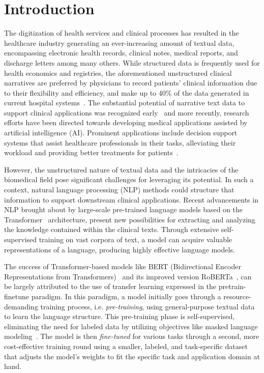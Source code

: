 \chapter{Introduction} \label{chap:introduction}

The digitization of health services and clinical processes has resulted in the
healthcare industry generating an ever-increasing amount of textual data,
encompassing electronic health records, clinical notes, medical reports, and
discharge letters among many others. While structured data is frequently used
for health economics and registries, the aforementioned unstructured clinical
narratives are preferred by physicians to record patients' clinical information
due to their flexibility and efficiency, and make up to 40\% of the data
generated in current hospital systems~\cite{wang2018clinical,
dalianis2009stockholm}. The substantial potential of narrative text data to
support clinical applications was recognized early~\cite{sager1994natural,
borst1991textinfo,friedman1995architectural} and more recently, research efforts
have been directed towards developing medical applications assisted by
artificial intelligence (AI). Prominent applications include decision support
systems that assist healthcare professionals in their tasks, alleviating their
workload and providing better treatments for patients~\cite{zhou2022natural}.

However, the unstructured nature of textual data and the intricacies of the
biomedical field pose significant challenges for leveraging its potential. In
such a context, natural language processing (NLP) methods could structure that
information to support downstream clinical applications. Recent advancements in
NLP brought about by large-scale pre-trained language models based on the
Transformer~\cite{vaswani2017attention} architecture, present new possibilities
for extracting and analyzing the knowledge contained within the clinical texts.
Through extensive self-supervised training on vast corpora of text, a model can
acquire valuable representations of a language, producing highly effective
language models. 

The success of Transformer-based models like BERT (Bidirectional Encoder
Representations from Transformers)~\cite{devlin2019bert} and its improved
version RoBERTa~\cite{liu2019roberta}, can be largely attributed to the use of
transfer learning expressed in the pretrain-finetune paradigm. In this paradigm,
a model initially goes through a resource-demanding training process, i.e.
\textit{pre-training}, using general-purpose textual data to learn the language
structure. This pre-training phase is self-supervised, eliminating the need for
labeled data by utilizing objectives like masked language
modeling~\cite{devlin2019bert}. The model is then \textit{fine-tuned} for
various tasks through a second, more cost-effective training round using a
smaller, labeled, and task-specific dataset that adjusts the model's weights to
fit the specific task and application domain at hand.  

